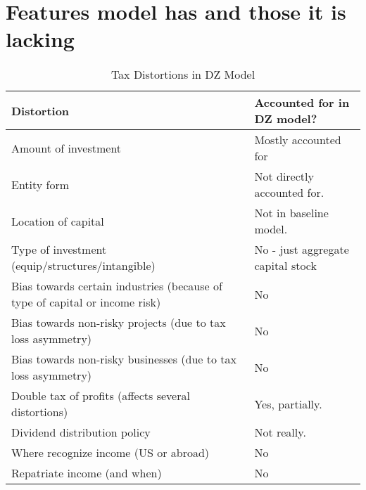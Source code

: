 \documentclass[article,11pt,letterpaper,fleqn]{article}
\theoremstyle{definition}
\numberwithin{equation}{section}
\begin{document}
\section{Features model has and those it is lacking}


\begin{table}[htbp]
  \centering
  \caption{Tax Distortions in DZ Model}
    \begin{tabular}{ll}
    \hline
    \hline
    Distortion & Accounted for in DZ model? \\
    \hline
    Amount of investment & Mostly accounted for \\
    Entity form & Not directly accounted for.  \\
    Location of capital & Not in baseline model. \\
    Type of investment (equip/structures/intangible) & No - just aggregate capital stock \\
    Bias towards certain industries (because of type of capital or income risk) & No \\
    Bias towards non-risky projects (due to tax loss asymmetry) & No \\
    Bias towards non-risky businesses (due to tax loss asymmetry) & No \\
    Double tax of profits (affects several distortions) & Yes, partially. \\
    Dividend distribution policy & Not really.   \\
    Where recognize income (US or abroad) & No \\
    Repatriate income (and when) & No \\
     \hline
    \hline
    \end{tabular}%
  \label{tab:tax_distortions}%
\end{table}%



\end{document}

